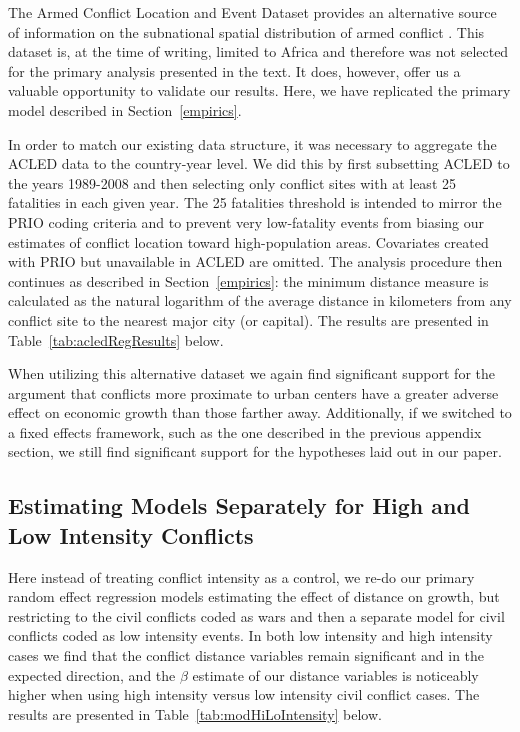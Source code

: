 The Armed Conflict Location and Event Dataset provides an alternative source of information on the subnational spatial distribution of armed conflict \citep{raleigh:linke:etal:2010}. This dataset is, at the time of writing, limited to Africa and therefore was not selected for the primary analysis presented in the text. It does, however, offer us a valuable opportunity to validate our results. Here, we have replicated the primary model described in Section~\ref{empirics}.

In order to match our existing data structure, it was necessary to aggregate the ACLED data to the country-year level. We did this by first subsetting ACLED to the years 1989-2008 and then selecting only conflict sites with at least 25 fatalities in each given year. The 25 fatalities threshold is intended to mirror the PRIO coding criteria and to prevent very low-fatality events from biasing our estimates of conflict location toward high-population areas. Covariates created with PRIO but unavailable in ACLED are omitted. The analysis procedure then continues as described in Section~\ref{empirics}: the minimum distance measure is calculated as the natural logarithm of the average distance in kilometers from any conflict site to the nearest major city (or capital). The results are presented in Table~\ref{tab:acledRegResults} below. 

When utilizing this alternative dataset we again find significant support for the argument that conflicts more proximate to urban centers have a greater adverse effect on economic growth than those farther away. Additionally, if we switched to a fixed effects framework, such as the one described in the previous appendix section, we still find significant support for the hypotheses laid out in our paper.


\FloatBarrier
\newpage

\subsection{Estimating Models Separately for High and Low Intensity Conflicts}

Here instead of treating conflict intensity as a control, we re-do our primary random effect regression models estimating the effect of distance on growth, but restricting to the civil conflicts coded as wars and then a separate model for civil conflicts coded as low intensity events. In both low intensity and high intensity cases we find that the conflict distance variables remain significant and in the expected direction, and the $\beta$ estimate of our distance variables is noticeably higher when using high intensity versus low intensity civil conflict cases. The results are presented in Table~\ref{tab:modHiLoIntensity} below.

